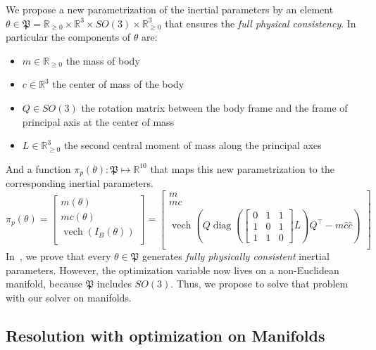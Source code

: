 We propose a new parametrization of the inertial parameters by an element $\theta \in \mathfrak{P} = \mathbb{R}_{\ge 0} \times \mathbb{R}^3 \times  SO(3) \times \mathbb{R}_{\ge 0}^3$ that ensures the \emph{full physical consistency}. In particular the components of $\theta$ are:
\begin{itemize}
    \item $m \in \mathbb{R}_{\ge 0}$ the mass of body
    \item $c \in \mathbb{R}^3$ the center of mass of the body
    \item $Q \in SO(3)$ the rotation matrix between the body frame and the frame of principal axis at the center of mass
    \item $L \in \mathbb{R}_{\ge 0}^3$ the second central moment of mass along the principal axes
\end{itemize}
And a function $\pi_p(\theta):\mathfrak{P}\mapsto\mathbb{R}^{10}$ that maps this new parametrization to the corresponding inertial parameters.
\begin{equation}
  \label{eq:pip}
  \pi_p(\theta)
  =
  \begin{bmatrix}
    m(\theta) \\
    mc(\theta) \\
    \operatorname{vech}\left(I_B(\theta)\right) \\
  \end{bmatrix}
  =
  \begin{bmatrix}
    m \\
    mc \\
    \operatorname{vech}\left( Q \operatorname{diag}{(\left[\begin{smallmatrix}
    0 & 1 & 1 \\
    1 & 0 & 1 \\
    1 & 1 & 0
    \end{smallmatrix}\right] L)}  Q^\top - m \hat{c} \hat{c} \right) \\
  \end{bmatrix} \nonumber
\end{equation}
In~\cite{traversaro:iros:2016}, we prove that every $\theta\in\mathfrak{P}$ generates \emph{fully physically consistent} inertial parameters.
However, the optimization variable now lives on a non-Euclidean manifold, because $\mathfrak{P}$ includes $SO(3)$.
Thus, we propose to solve that problem with our solver on manifolds.

\subsection{Resolution with optimization on Manifolds}
\label{sub:resolution_with_optimization_on_manifolds}

